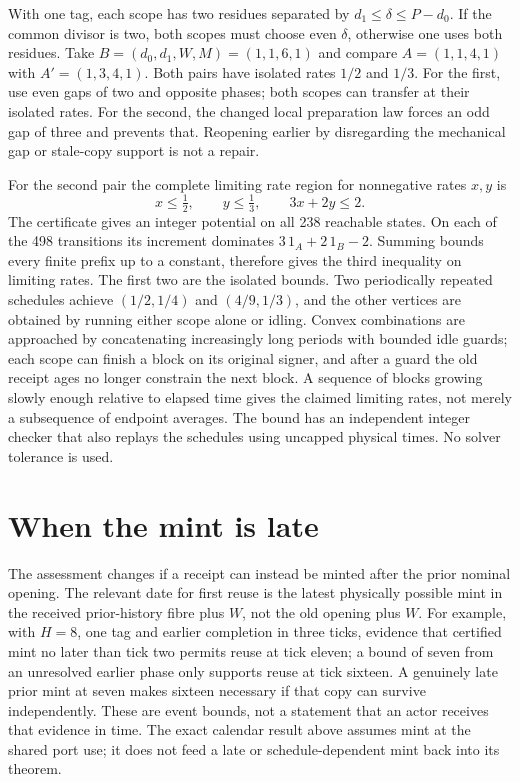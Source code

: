 \documentclass[11pt]{article}
\begin{document}
With one tag, each scope has two residues separated by
\(d_1\leq\delta\leq P-d_0\). If the common divisor is two, both scopes
must choose even \(\delta\), otherwise one uses both residues.
Take \(B=(d_0,d_1,W,M)=(1,1,6,1)\) and compare
\(A=(1,1,4,1)\) with \(A'=(1,3,4,1)\). Both pairs have isolated rates
\(1/2\) and \(1/3\). For the first, use even gaps of two and opposite
phases; both scopes can transfer at their isolated rates.
For the second, the changed local preparation law forces an odd gap
of three and prevents that. Reopening earlier by disregarding the
mechanical gap or stale-copy support is not a repair.

For the second pair the complete limiting rate region for
nonnegative rates \(x,y\) is
\[
     x\leq \tfrac12,\qquad y\leq\tfrac13,\qquad 3x+2y\leq2 .
\]
The certificate gives an integer potential on all 238 reachable
states. On each of the 498 transitions its increment dominates
\(3\,1_A+2\,1_B-2\). Summing bounds every finite prefix up to a
constant, therefore gives the third inequality on limiting rates.
The first two are the isolated bounds. Two periodically repeated
schedules achieve \((1/2,1/4)\) and \((4/9,1/3)\), and the other
vertices are obtained by running either scope alone or idling.
Convex combinations are approached by concatenating increasingly
long periods with bounded idle guards; each scope can finish a block
on its original signer, and after a guard the old receipt ages no
longer constrain the next block. A sequence of blocks growing slowly
enough relative to elapsed time gives the claimed limiting rates,
not merely a subsequence of endpoint averages. The bound has an
independent integer checker that also replays the schedules using
uncapped physical times. No solver tolerance is used.

\section{When the mint is late}
The assessment changes if a receipt can instead be minted after the
prior nominal opening. The relevant date for first reuse is the
latest physically possible mint in the received prior-history fibre
plus \(W\), not the old opening plus \(W\). For example, with \(H=8\),
one tag and earlier completion in three ticks, evidence that certified
mint no later than tick two permits reuse at tick eleven; a bound
of seven from an unresolved earlier phase only supports reuse at
tick sixteen. A genuinely late prior mint at seven makes sixteen
necessary if that copy can survive independently. These are event
bounds, not a statement that an actor receives that evidence in time.
The exact calendar result above assumes mint at the shared port use;
it does not feed a late or schedule-dependent mint back into its theorem.
\end{document}
